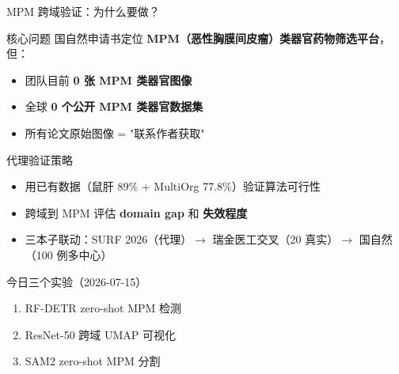 \documentclass[aspectratio=169, 10pt]{beamer}
\begin{document}
\begin{frame}{MPM 跨域验证：为什么要做？}
  \begin{alertblock}{核心问题}
    国自然申请书定位 \textbf{MPM（恶性胸膜间皮瘤）类器官药物筛选平台}，但：
    \begin{itemize}
      \item 团队目前 \textbf{0 张 MPM 类器官图像}
      \item 全球 \textbf{0 个公开 MPM 类器官数据集}
      \item 所有论文原始图像 = "联系作者获取"
    \end{itemize}
  \end{alertblock}
  \vspace{-0.3em}
  \begin{block}{代理验证策略}
    \begin{itemize}
      \item 用已有数据（鼠肝 89\% + MultiOrg 77.8\%）验证算法可行性
      \item 跨域到 MPM 评估 \textbf{domain gap} 和 \textbf{失效程度}
      \item 三本子联动：SURF 2026（代理）$\to$ 瑞金医工交叉（20 真实）$\to$ 国自然（100 例多中心）
    \end{itemize}
  \end{block}
  \vspace{-0.3em}
  \begin{block}{今日三个实验（2026-07-15）}
    \begin{enumerate}
      \item RF-DETR zero-shot MPM 检测
      \item ResNet-50 跨域 UMAP 可视化
      \item SAM2 zero-shot MPM 分割
    \end{enumerate}
  \end{block}
\end{frame}
\end{document}
